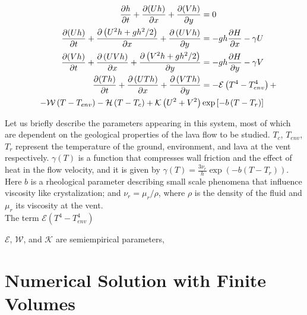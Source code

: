 \documentclass[12pt]{article}
\begin{document}
\begin{align}
\frac{\partial h}{\partial t}+\frac{\partial(U h)}{\partial x}+\frac{\partial(V h)}{\partial y}&=0 \label{eq: 1}\\
\frac{\partial(U h)}{\partial t}+\frac{\partial\left( U^{2} h+g h^{2} / 2\right)}{\partial x}+\frac{\partial\left( U V h\right)}{\partial y}&=-g h \frac{\partial H}{\partial x}-\gamma U \label{eq: 2}\\
\frac{\partial(V h)}{\partial t}+\frac{\partial\left( U V h\right)}{\partial x}+\frac{\partial\left( V^{2} h+g h^{2} / 2\right)}{\partial y}&=-g h \frac{\partial H}{\partial y}-\gamma V \label{eq: 3}\\
\frac{\partial(T h)}{\partial t}+\frac{\partial\left( U T h\right)}{\partial x}+\frac{\partial\left( V T h\right)}{\partial y}&=-\mathcal{E}\left(T^{4}-T_{e n v}^{4}\right)+ \label{eq: 4}\\
\quad-\mathcal{W}\left(T-T_{e n v}\right)-\mathcal{H}\left(T-T_{c}\right)+\mathcal{K}\left(U^{2}+V^{2}\right) &\exp \left[-b\left(T-T_{r}\right)\right] \notag
\end{align}

Let us briefly describe the parameters appearing in this system, most of which are dependent on the geological properties of the lava flow to be studied. $T_c$, $T_{env}$, $T_{r}$ represent the temperature of the ground, environment, and lava at the vent respectively.
$\gamma(T)$ is a function that compresses wall friction and the effect of heat in the flow velocity, and it is given by $\gamma(T)=\frac{3\nu_r}{h}\exp(-b(T-T_r))$.
Here $b$ is a rheological parameter describing small scale phenomena that influence viscosity like crystalization; and $\nu_r=\mu_r/\rho$, where $\rho$ is the density of the fluid and $\mu_r$ its viscosity at the vent.\\





The term $\mathcal{E}\left(T^{4}-T_{e n v}^{4}\right)$

$\mathcal{E}$, $\mathcal{W}$, and $\mathcal{K}$ are semiempirical parameters,


\section{Numerical Solution with Finite Volumes}
\end{document}
